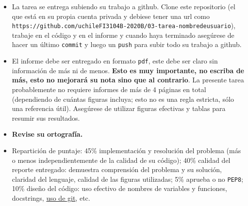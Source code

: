 \documentclass[letter, 11pt]{article}
\begin{document}
\begin{itemize}
\item La tarea se entrega subiendo su trabajo a github. Clone este repositorio
  (el que está en su propia cuenta privada y debiese tener una url como\\
  \texttt{https://github.com/uchileFI3104B-2020B/03-tarea-nombredeusuario}),
  trabaje en el código y en el informe y cuando haya terminado asegúrese de
  hacer un último \texttt{commit} y luego un \texttt{push} para subir todo su
  trabajo a github.

\item El informe debe ser entregado en formato \texttt{pdf}, este debe ser
  claro sin información de más ni de menos. \textbf{Esto es muy importante, no
  escriba de más, esto no mejorará su nota sino que al contrario}. La presente
  tarea probablemente no requiere informes de más de 4 páginas en total
  (dependiendo de cuántas figuras incluya; esto no es una regla estricta, sólo
  una referencia útil).  Asegúrese de utilizar figuras efectivas y tablas para
  resumir sus resultados.

\item \textbf{Revise su ortografía.}

 \item Repartición de puntaje: 45\% implementación y resolución del problema
   (más o menos independientemente de la calidad de su código); 40\% calidad
   del reporte entregado: demuestra comprensión del problema y su solución,
   claridad del lenguaje, calidad de las figuras utilizadas; 5\% aprueba o no
   \texttt{PEP8}; 10\% diseño del código: uso efectivo de nombres de variables
   y funciones, docstrings, \underline{uso de git}, etc.

\end{itemize}
\end{document}
